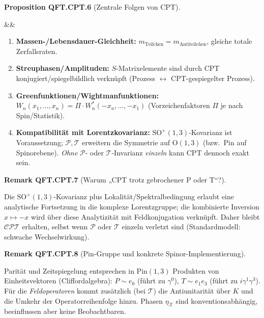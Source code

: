 \documentclass[10pt, letterpaper]{article}
\newcommand{\SO}{\mathrm{SO}}
\newcommand{\Pin}{\mathrm{Pin}}
\newcommand{\Ogroup}{\mathrm{O}}
\newenvironment{romanenum}[1][]
  {%
    \ifx&#1&
    \else
      \textbf{#1}\quad
    \fi
    \begin{enumerate}[label=\roman*)]
  }
  {%
    \end{enumerate}%
  }
\newcommand{\CustomHeading}[3]{%
  \par\medskip\noindent%
  \textbf{#1 #2} \textnormal{(#3)}.\enskip%
}
\newenvironment{PROP}[2]{\begin{unitbox}\CustomHeading{Proposition}{#1}{#2}}{\end{unitbox}}
\newenvironment{REM}[2]{\begin{unitbox}\CustomHeading{Remark}{#1}{#2}}{\end{unitbox}}
\begin{document}
\begin{PROP}{QFT.CPT.6}{Zentrale Folgen von CPT}
\begin{romanenum}
  \item \textbf{Massen-/Lebensdauer-Gleichheit:} $m_{\text{Teilchen}}=m_{\text{Antiteilchen}}$, gleiche totale Zerfallsraten.
  \item \textbf{Streuphasen/Amplituden:} $S$-Matrixelemente sind durch CPT konjugiert/spiegelbildlich verknüpft (Prozess $\leftrightarrow$ CPT-gespiegelter Prozess).
  \item \textbf{Greenfunktionen/Wightmanfunktionen:} $W_n(x_1,\dots,x_n)=\Pi\cdot W_n^*(-x_n,\dots,-x_1)$ (Vorzeichenfaktoren $\Pi$ je nach Spin/Statistik).
  \item \textbf{Kompatibilität mit Lorentzkovarianz:} $\SO^+(1,3)$-Kovarianz ist Voraussetzung; $\mathcal P,\mathcal T$ erweitern die Symmetrie auf $\Ogroup(1,3)$ (bzw.\ $\Pin$ auf Spinorebene). \emph{Ohne} $\mathcal P$- oder $\mathcal T$-Invarianz \emph{einzeln} kann CPT dennoch exakt sein.
\end{romanenum}
\end{PROP}

\begin{REM}{QFT.CPT.7}{Warum „CPT trotz gebrochener P oder T“?}
Die $\SO^+(1,3)$-Kovarianz plus Lokalität/Spektralbedingung erlaubt eine analytische Fortsetzung in die komplexe Lorentzgruppe; die kombinierte Inversion $x\mapsto -x$ wird über diese Analytizität mit Feldkonjugation verknüpft. Daher bleibt $\mathcal C\mathcal P\mathcal T$ erhalten, selbst wenn $\mathcal P$ oder $\mathcal T$ einzeln verletzt sind (Standardmodell: schwache Wechselwirkung).
\end{REM}

\begin{REM}{QFT.CPT.8}{Pin-Gruppe und konkrete Spinor-Implementierung}
Parität und Zeitspiegelung entsprechen in $\Pin(1,3)$ Produkten von Einheitsvektoren (Cliffordalgebra): $P\sim e_0$ (führt zu $\gamma^0$), $T\sim e_1 e_3$ (führt zu $i\gamma^1\gamma^3$). Für die \emph{Feldoperatoren} kommt zusätzlich (bei $\mathcal T$) die Antiunitarität über $K$ und die Umkehr der Operatorreihenfolge hinzu. Phasen $\eta_{\mathcal X}$ sind konventionsabhängig, beeinflussen aber keine Beobachtbaren.
\end{REM}
\end{document}
